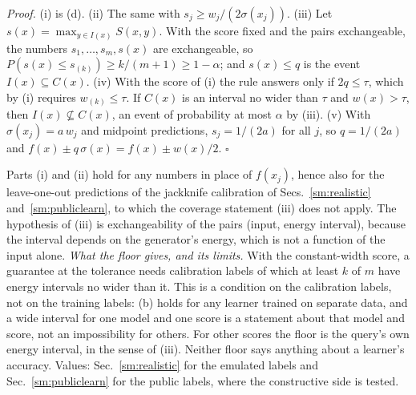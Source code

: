 \documentclass[aps,prx,onecolumn,10pt,nofootinbib,longbibliography,floatfix]{revtex4-2}
\theoremstyle{remark}
\begin{document}
\emph{Proof.} (i) is (d). (ii) The same with $s_j\ge w_j/(2\sigma(x_j))$.
(iii) Let $s(x)=\max_{y\in I(x)}S(x,y)$. With the score fixed and the pairs exchangeable, the numbers
$s_1,\dots,s_m,s(x)$ are exchangeable, so $P(s(x)\le s_{(k)})\ge k/(m+1)\ge1-\alpha$; and $s(x)\le q$ is the
event $I(x)\subseteq C(x)$.
(iv) With the score of (i) the rule answers only if $2q\le\tau$, which by (i) requires $w_{(k)}\le\tau$. If
$C(x)$ is an interval no wider than $\tau$ and $w(x)>\tau$, then $I(x)\not\subseteq C(x)$, an event of
probability at most $\alpha$ by (iii).
(v) With $\sigma(x_j)=a\,w_j$ and midpoint predictions, $s_j=1/(2a)$ for all $j$, so $q=1/(2a)$ and
$f(x)\pm q\,\sigma(x)=f(x)\pm w(x)/2$. $\square$

Parts (i) and (ii) hold for any numbers in place of $f(x_j)$, hence also for the leave-one-out predictions of the
jackknife calibration of Secs.~\ref{sm:realistic} and~\ref{sm:publiclearn}, to which the coverage statement (iii)
does not apply. The hypothesis of (iii) is exchangeability of the pairs (input, energy interval), because the
interval depends on the generator's energy, which is not a function of the input alone.
\emph{What the floor gives, and its limits.} With the constant-width score, a guarantee at the tolerance needs
calibration labels of which at least $k$ of $m$ have energy intervals no wider than it. This is a condition on the
calibration labels, not on the training labels: (b) holds for any learner trained on separate data, and a wide
interval for one model and one score is a statement about that model and score, not an impossibility for others.
For other scores the floor is the query's own energy interval, in the sense of (iii). Neither floor says anything
about a learner's accuracy. Values: Sec.~\ref{sm:realistic} for the emulated labels and Sec.~\ref{sm:publiclearn}
for the public labels, where the constructive side is tested.
\end{document}
